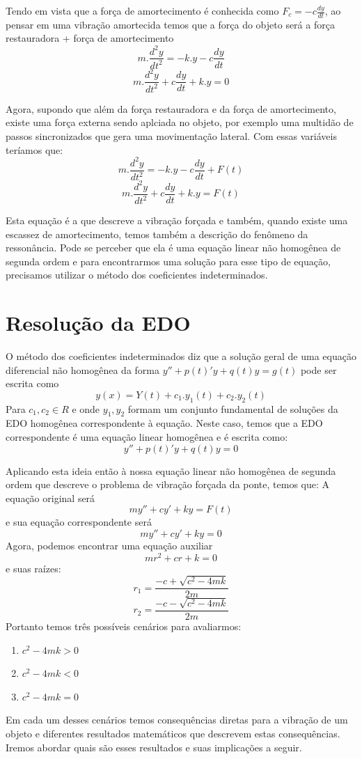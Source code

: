 \documentclass[]{article}
\begin{document}
Tendo em vista que a força de amortecimento é conhecida como $F_c = -c\frac{dy}{dt}$,
ao pensar em uma vibração amortecida temos que a força do objeto será a 
força restauradora + força de amortecimento
\[ m.\frac{d^2 y}{d t^2} = -k.y - c\frac{dy}{dt}\]
\[ m.\frac{d^2 y}{d t^2} + c\frac{dy}{dt}  + k.y = 0\]

Agora, supondo que além da força restauradora e da força de amortecimento, existe uma força externa sendo aplciada no
objeto, por exemplo uma multidão de passos sincronizados que gera uma movimentação lateral.
Com essas variáveis teríamos que:
\[ m.\frac{d^2 y}{d t^2} = -k.y - c\frac{dy}{dt} + F(t)\] 
\[ m.\frac{d^2 y}{d t^2} + c\frac{dy}{dt}  + k.y = F(t)\] 

Esta equação é a que descreve a vibração forçada e também, quando existe uma escassez de amortecimento,
temos também a descrição do fenômeno da ressonância.
Pode se perceber que ela é uma equação linear não homogênea de segunda ordem e para encontrarmos 
uma solução para esse tipo de equação, precisamos utilizar o método dos coeficientes indeterminados.

\pagebreak 
\section{Resolução da EDO}
O método dos coeficientes indeterminados diz que a solução geral de uma equação 
diferencial não homogênea
da forma $y'' + p(t)'y + q(t)y = g(t)$ pode ser escrita como
\[ y(x) = Y(t) + c_1.y_1(t) + c_2.y_2(t)\] 
Para $c_1, c_2 \in R$ e onde ${y_1,y_2}$ formam um conjunto fundamental de soluções
da EDO homogênea correspondente à equação. Neste caso, temos que a EDO correspondente é uma equação
linear homogênea e é escrita como: 
\[y'' + p(t)'y + q(t)y = 0\] 

Aplicando esta ideia então à nossa equação linear não homogênea de segunda ordem que descreve o problema 
de vibração forçada da ponte, temos que:
A equação original será 
\[  my'' + cy'  + ky = F(t)\] 
e sua equação correspondente será
\[ my'' + cy'  + ky = 0\]
Agora, podemos encontrar uma equação auxiliar 
\[ mr^2 + cr  + k = 0\] 
e suas raízes:
\[ r_1 = \frac{-c + \sqrt{c^2 - 4mk}}{2m}\] \[ r_2 = \frac{-c - \sqrt{c^2 - 4mk}}{2m} \]
Portanto temos três possíveis cenários para avaliarmos:
\begin{enumerate}
    \item $c^2 - 4mk > 0$
    \item $c^2 - 4mk < 0$
    \item $c^2 - 4mk = 0$
\end{enumerate}
Em cada um desses cenários temos consequências diretas para a vibração de um objeto e
diferentes resultados matemáticos que descrevem estas consequências. Iremos abordar
quais são esses resultados e suas implicações a seguir.
\pagebreak
\end{document}
